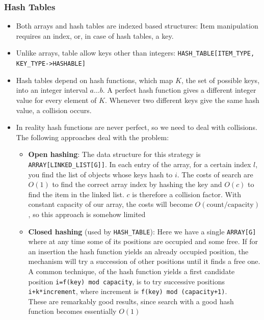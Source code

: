 \documentclass[a4paper]{article}
\newcommand{\inline}[1]{\lstinline!#1!}%
\begin{document}
\subsubsection{Hash Tables}
\begin{itemize}
\item Both arrays and hash tables are indexed based structures: Item manipulation requires an index, or, in case of  hash tables, a key. 
\item Unlike arrays, table allow keys other than integers: \inline{HASH_TABLE[ITEM_TYPE, KEY_TYPE->HASHABLE]}
\item Hash tables depend on hash functions, which map $K$, the set of possible keys, into an integer interval $a\dots b$. A perfect hash function gives a different integer value for every element of $K$. Whenever two different keys give the same hash value, a collision occurs. 
\item In reality hash functions are never perfect, so we need to deal with collisions. The following approaches deal with the problem:
\begin{itemize}
\item \textbf{Open hashing}: The data structure for this strategy is \inline{ARRAY[LINKED_LIST[G]]}. In each entry of the array, for a certain index $l$, you find the list of objects whose keys hash to $i$. The costs of search are $O(1)$ to find the correct array index by hashing the key and $O(c)$ to find the item in the linked list. $c$ is therefore a collision factor. With constant capacity of our array, the costs will become $O(\mathrm{count}/\mathrm{capacity})$, so this approach is somehow limited
\item \textbf{Closed hashing} (used by \inline{HASH_TABLE}): Here we have a single \inline{ARRAY[G]} where at any time some of its positions are occupied and some free. If for an insertion the hash function yields an already occupied position, the mechanism will try a succession of other positions until it finds a free one.\\
A common technique, of the hash function yields a first candidate position \inline{i=f(key) mod capacity}, is to try successive positions \inline{i+k*increment}, where increment is \inline{f(key) mod (capacity+1)}.\\
These are remarkably good results, since search with a good hash function becomes essentially $O(1)$
\end{itemize}
\end{itemize}
\end{document}
